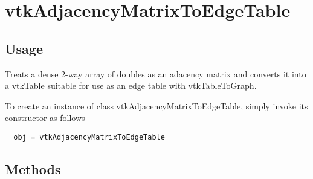 \section{vtkAdjacencyMatrixToEdgeTable}

\subsection{Usage}

 Treats a dense 2-way array of doubles as an adacency matrix and converts it into a
 vtkTable suitable for use as an edge table with vtkTableToGraph.

To create an instance of class vtkAdjacencyMatrixToEdgeTable, simply
invoke its constructor as follows
\begin{verbatim}
  obj = vtkAdjacencyMatrixToEdgeTable
\end{verbatim}
\subsection{Methods}

